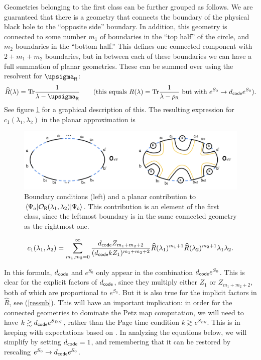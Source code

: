\documentclass[11pt]{article}
\newcommand{\be}{\begin{equation}}
\newcommand{\ee}{\end{equation}}
\numberwithin{equation}{section}
\def\tr{\text{Tr}}
\begin{document}
Geometries belonging to the first class can be further grouped as follows. We are guaranteed that there is a geometry that connects the boundary of the physical black hole to the ``opposite side'' boundary. In addition, this geometry is connected to some number $m_1$ of boundaries in the ``top half'' of the circle, and $m_2$ boundaries in the ``bottom half.'' This defines one connected component with $2+m_1+m_2$ boundaries, but in between each of these boundaries we can have a full summation of planar geometries. These can be summed over using the resolvent for $\upsigma_{\sf{R}}$:
\be
\widehat{R}(\lambda) = \tr\frac{1}{\lambda - \upsigma_{\sf{R}}} \hspace{20pt} (\text{this equals $R(\lambda) = \tr\frac{1}{\lambda - \rho_{\sf{R}}}$ but with $e^{S_0}\to d_{\sf{code}}e^{S_0}$}).\label{ressub}
\ee
See figure \ref{fig:petzcorr} for a graphical description of this. The resulting expression for $c_1(\lambda_1,\lambda_2)$ in the planar approximation is
\begin{figure}[t]
\centering
	\includegraphics[scale=0.6]{images/petzcorrection.pdf}
	\caption{Boundary conditions (left) and a planar contribution to $\langle\Psi_a|\mathcal{O}_{\sf{R}}(\lambda_1,\lambda_2)|\Psi_b\rangle$. This contribution is an element of the first class, since the leftmost boundary is in the same connected geometry as the rightmost one.}
	\label{fig:petzcorr}
\end{figure}
\be
c_1(\lambda_1,\lambda_2)=\sum_{m_1, m_2=0}^{\infty}\frac{d_{\sf{code}}Z_{m_1+m_2+2}}{(d_{\sf{code}}kZ_1)^{m_1+m_2+2}}\widehat{R}(\lambda_1)^{m_1+1}\widehat{R}(\lambda_2)^{m_2+1}\lambda_1\lambda_2.\label{c1}
\ee

In this formula, $d_{\sf{code}}$ and $e^{S_0}$ only appear in the combination $d_{\sf{code}}e^{S_0}$. This is clear for the explicit factors of $d_{\sf{code}}$, since they multiply either $Z_1$ or $Z_{m_1+m_2+2}$, both of which are proportional to $e^{S_0}$. But it is also true for the implicit factors in $\widehat{R}$, see (\ref{ressub}). This will have an important implication: in order for the connected geometries to dominate the Petz map computation, we will need to have $k \gtrsim d_{\sf{code}}e^{S_{BH}}$, rather than the Page time condition $k \gtrsim e^{S_{BH}}$. This is in keeping with expectations based on \cite{Hayden:2007cs, Hayden:2018khn, Penington:2019npb}. In analyzing the equations below, we will simplify by setting $d_{\sf{code}} = 1$, and remembering that it can be restored by rescaling $e^{S_0} \to d_{\sf{code}}e^{S_0}$. 
\end{document}
